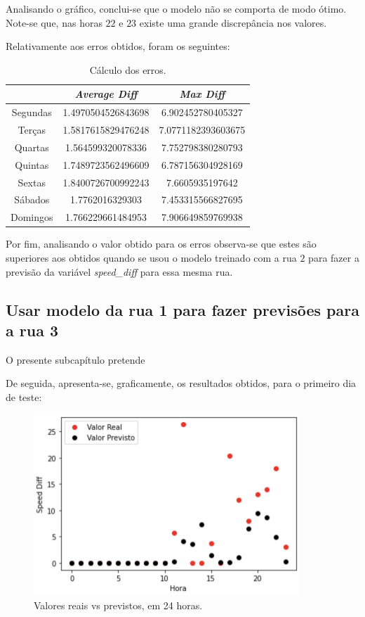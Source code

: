 \documentclass[a4paper, 12pt]{article}
\begin{document}
Analisando o gráfico, conclui-se que o modelo não se comporta de modo ótimo. Note-se que, nas horas $22$ e $23$ existe uma grande discrepância nos valores.

Relativamente aos erros obtidos, foram os seguintes:

\begin{table}[H]
	\centering
	\begin{tabular}{||c||c|c||}
		\hline\hline
		& \textit{Average Diff} & \textit{Max Diff} \\
		\hline\hline
		Segundas & 1.4970504526843698
		& 6.902452780405327 \\
		\hline
		Terças  &
		1.5817615829476248
		& 7.0771182393603675 \\
		\hline
		Quartas & 
		1.564599320078336 & 7.752798380280793	\\
		\hline
		Quintas  & 1.7489723562496609
		& 6.787156304928169	\\
		\hline
		Sextas & 
		1.8400726700992243 & 7.6605935197642 \\
		\hline
		Sábados  & 1.7762016329303
		& 7.453315566827695 \\
		\hline
		Domingos & 
		1.766229661484953 & 
		7.906649859769938
		\\
		\hline\hline
	\end{tabular}
	\label{table:mod2_rua1}
	\caption{Cálculo dos erros.}
\end{table}

Por fim, analisando o valor obtido para os erros observa-se que estes são superiores aos obtidos quando se usou o modelo treinado com a rua $2$ para fazer a previsão da variável \textit{speed\_diff} para essa mesma rua.

\subsection{Usar modelo da rua 1 para fazer previsões para a rua 3}

O presente subcapítulo pretende

De seguida, apresenta-se, graficamente, os resultados obtidos, para o primeiro dia de teste:

\begin{figure}[H]
	\centering
	\includegraphics[width=10cm]{resultados/real_prev_mod1_rua3.png}
	\caption{Valores reais vs previstos, em 24 horas.}
\end{figure}
\end{document}

